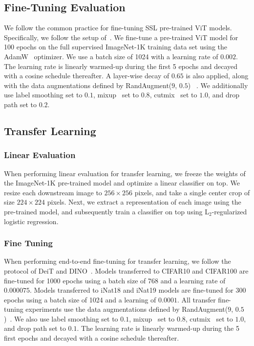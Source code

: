 \documentclass{article}
\begin{document}
\subsection{Fine-Tuning Evaluation}
We follow the common practice for fine-tuning SSL pre-trained ViT models.
Specifically, we follow the setup of~\citep{touvron2021training,bao2021beit,he2021masked}.
We fine-tune a pre-trained ViT model for 100 epochs on the full supervised ImageNet-1K training data set using the AdamW~\citep{loshchilov2017decoupled} optimizer.
We use a batch size of 1024 with a learning rate of $0.002$.
The learning rate is linearly warmed-up during the first 5 epochs and decayed with a cosine schedule thereafter.
A layer-wise decay of $0.65$ is also applied, along with the data augmentations defined by RandAugment($9$, $0.5$) ~\citep{cubuk2019autoaugment}. We additionally use label smoothing set to $0.1$, mixup~\citep{zhang2017mixup} set to $0.8$, cutmix~\citep{yun2019cutmix} set to $1.0$, and drop path set to $0.2$.

\subsection{Transfer Learning}

\subsubsection{Linear Evaluation}
When performing linear evaluation for transfer learning, we freeze the weights of the ImageNet-1K pre-trained model and optimize a linear classifier on top. We resize each downstream image to $256 \times 256$ pixels, and take a single center crop of size $224 \times 224$ pixels. Next, we extract a representation of each image using the pre-trained model, and subsequently train a classifier on top using L$_2$-regularized logistic regression. 

\subsubsection{Fine Tuning}
When performing end-to-end fine-tuning for transfer learning, we follow the protocol of DeiT and DINO~\citep{touvron2021training,caron2021emerging}.  Models transferred to CIFAR10 and CIFAR100 are fine-tuned for 1000 epochs using a batch size of 768 and a learning rate of $0.000075$. Models transferred to iNat18 and iNat19 models are fine-tuned for 300 epochs using a batch size of 1024 and a learning of $0.0001$.
All transfer fine-tuning experiments use the data augmentations defined by RandAugment($9$, $0.5$)~\citep{cubuk2019autoaugment}.
We also use label smoothing set to $0.1$, mixup~\citep{zhang2017mixup} set to $0.8$, cutmix~\citep{yun2019cutmix} set to $1.0$, and drop path set to $0.1$.
The learning rate is linearly warmed-up during the 5 first epochs and decayed with a cosine schedule thereafter.
\end{document}
